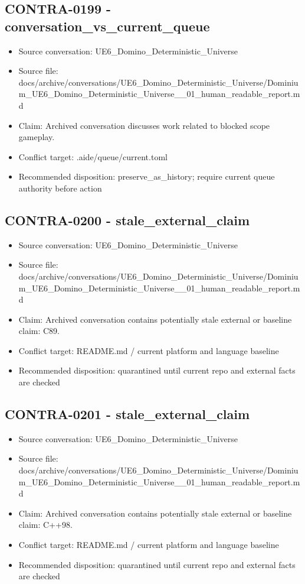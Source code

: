 \documentclass[11pt,a4paper]{report}
\begin{document}
\subsection{CONTRA-0199 - conversation\_vs\_current\_queue}

\begin{itemize}
\item Source conversation: UE6\_Domino\_Deterministic\_Universe
\item Source file: docs/archive/conversations/UE6\_Domino\_Deterministic\_Universe/Dominium\_UE6\_Domino\_Deterministic\_Universe\_\_01\_human\_readable\_report.md
\item Claim: Archived conversation discusses work related to blocked scope gameplay.
\item Conflict target: .aide/queue/current.toml
\item Recommended disposition: preserve\_as\_history; require current queue authority before action
\end{itemize}

\subsection{CONTRA-0200 - stale\_external\_claim}

\begin{itemize}
\item Source conversation: UE6\_Domino\_Deterministic\_Universe
\item Source file: docs/archive/conversations/UE6\_Domino\_Deterministic\_Universe/Dominium\_UE6\_Domino\_Deterministic\_Universe\_\_01\_human\_readable\_report.md
\item Claim: Archived conversation contains potentially stale external or baseline claim: C89.
\item Conflict target: README.md / current platform and language baseline
\item Recommended disposition: quarantined until current repo and external facts are checked
\end{itemize}

\subsection{CONTRA-0201 - stale\_external\_claim}

\begin{itemize}
\item Source conversation: UE6\_Domino\_Deterministic\_Universe
\item Source file: docs/archive/conversations/UE6\_Domino\_Deterministic\_Universe/Dominium\_UE6\_Domino\_Deterministic\_Universe\_\_01\_human\_readable\_report.md
\item Claim: Archived conversation contains potentially stale external or baseline claim: C++98.
\item Conflict target: README.md / current platform and language baseline
\item Recommended disposition: quarantined until current repo and external facts are checked
\end{itemize}
\end{document}
